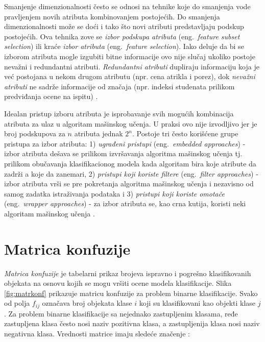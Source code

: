 \documentclass[12pt,oneside]{memoir}
\begin{document}
Smanjenje dimenzionalnosti često se odnosi na tehnike koje do smanjenja vode pravljenjem novih atributa kombinovanjem postojećih. Do smanjenja dimenzionalnosti može se doći i tako što novi atributi predstavljaju podskup postojećih. Ova tehnika zove se \textit{izbor podskupa atributa} (eng.~\textit{feature subset selection}) ili kraće \textit{izbor atributa} (eng.~\textit{feature selection}). Iako deluje da bi se izborom atributa mogle izgubiti bitne informacije ovo nije slučaj ukoliko postoje nevažni i redundantni atributi. \textit{Redundantni atributi} dupliraju informaciju koja je već postojana u nekom drugom atributu (npr. cena atrikla i porez), dok \textit{nevažni atributi} ne sadrže informacije od značaja (npr. indeksi studenata prilikom predviđanja ocene na ispitu) \cite{mitic}. 

Idealan pristup izboru atributa je isprobavanje svih mogućih kombinacija atributa za ulaz u algoritam mašinskog učenja. U praksi ovo nije izvodljivo jer je broj podskupova za $n$ atributa jednak $2^n$. Postoje tri često korišćene grupe pristupa za izbor atributa: 1) \textit{ugrađeni pristupi} (eng.~\textit{embedded approaches}) - izbor atributa dešava se prilikom izvršavanja algoritma mašinskog učenja tj. prilikom obučavanja klasifikacionog modela kada algoritam bira koje atribute da zadrži a koje da zanemari, 2) \textit{pristupi koji koriste filtere} (eng.~\textit{filter approaches}) - izbor atributa vrši se pre pokretanja algoritma mašinskog učenja i nezavisno od samog zadatka istraživanja podataka i 3) \textit{pristupi koji koriste omotače} (eng.~\textit{wrapper approaches}) - za izbor atributa se, kao crna kutija, koristi neki algoritam mašinskog učenja \cite{mitic, UMLFTA, aggarwal}.

\section{Matrica konfuzije}
\label{sec:matrica konfuzije}

\textit{Matrica konfuzije} je tabelarni prikaz brojeva ispravno i pogrešno klasifikovanih objekata na osnovu kojih se mogu vršiti ocene modela klasifikacije. Slika \ref{fig:matrkonf} prikazuje matricu konfuzije za problem binarne klasifikacije. Svako od polja $f_{ij}$ označava broj objekata klase $i$ koji su klasifikovani kao objekti klase $j$. Za problem binarne klasifikacije sa nejednako zastupljenim klasama, ređe zastupljena klasa često nosi naziv pozitivna klasa, a zastupljenija klasa nosi naziv negativna klasa. Vrednosti matrice imaju sledeće značenje \cite{mitic}:
\end{document}
